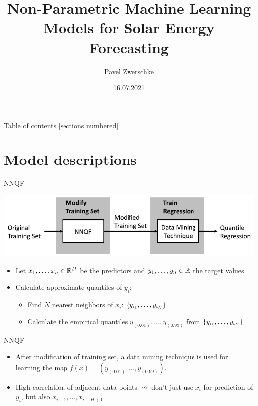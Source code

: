 \documentclass[10pt,aspectratio=169]{beamer}
\title{Non-Parametric Machine Learning Models for Solar Energy Forecasting}
\date{16.07.2021}
\author{Pavel Zwerschke}
\institute{Karlsruhe Institute of Technology}
\begin{document}
\maketitle

\begin{frame}{Table of contents}
    [sections numbered]
    \tableofcontents%
\end{frame}

\section{Model descriptions}

\begin{frame}{NNQF}
    \begin{center}
        \includegraphics{plots/nnqf_approach.pdf}
    \end{center}
    \begin{itemize}
        \item Let \(x_1, \ldots, x_n \in \mathbb{R}^D\) be the predictors and \(y_1, \ldots, y_n\in \mathbb{R}\) the target values.
        \item Calculate approximate quantiles of \(y_i\):
        \begin{itemize}
            \item Find \(N\) nearest neighbors of \(x_i\): \(\{y_{i_1}, \ldots, y_{i_N}\}\)
            \item Calculate the empirical quantiles \(y_{(0.01)}, \ldots, y_{(0.99)}\) from \(\{y_{i_1}, \ldots, y_{i_N}\}\)
        \end{itemize}
    \end{itemize}
\end{frame}

\begin{frame}{NNQF}
    \begin{itemize}
        \item After modification of training set, a data mining technique is used for learning the map \(f(x) = (y_{(0.01)}, \ldots, y_{(0.99)})\).
        \item High correlation of adjacent data points \(\leadsto\) don't just use \(x_i\) for prediction of \(y_i\), but also 
        \(x_{i-1}, \ldots, x_{i-H+1}\)
    \end{itemize}
\end{frame}
\end{document}
